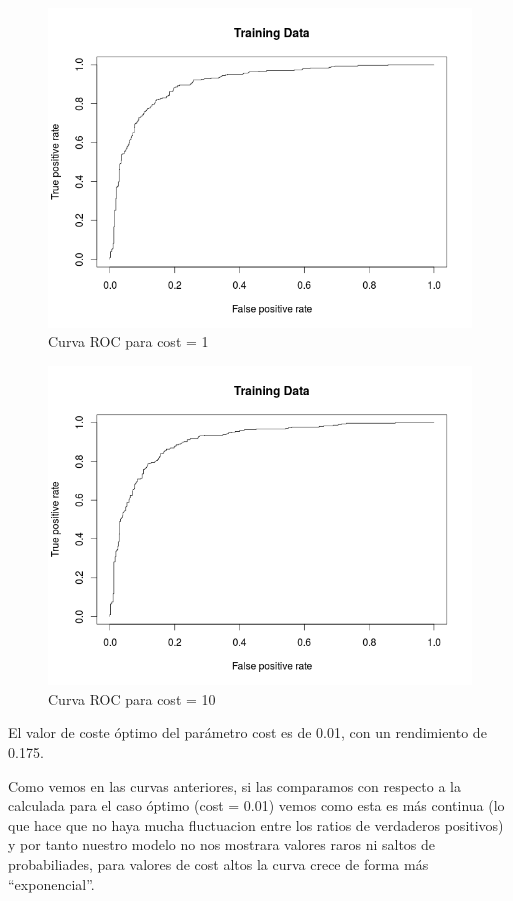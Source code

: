 \begin{figure}[H]
\centering
\includegraphics[scale=0.50]{ej1-34.png}
\caption{Curva ROC para cost = 1}
\label{}
\end{figure}

\begin{figure}[H]
\centering
\includegraphics[scale=0.50]{ej1-35.png}
\caption{Curva ROC para cost = 10}
\label{}
\end{figure}

El valor de coste óptimo del parámetro cost es de 0.01, con un rendimiento de 0.175.

Como vemos en las curvas anteriores, si las comparamos con respecto a la calculada para el caso óptimo (cost = 0.01) vemos como esta es más continua (lo que hace que no haya mucha fluctuacion entre los ratios de verdaderos positivos) y por tanto nuestro modelo no nos mostrara valores raros ni saltos de probabiliades, para valores de cost altos la curva crece de forma más ``exponencial''.



